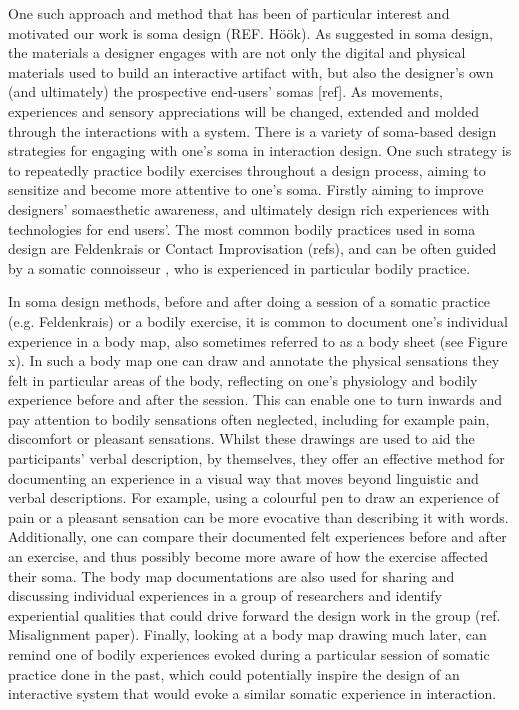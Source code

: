 One such approach and method that has been of particular interest and motivated our work is soma design (REF. Höök). As suggested in soma design, the materials a designer engages with are not only the digital and physical materials used to build an interactive artifact with, but also the designer’s own (and ultimately) the prospective end-users’ somas [ref]. As movements, experiences and sensory appreciations will be changed, extended and molded through the interactions with a system. There is a variety of soma-based design strategies for engaging with one's soma in interaction design. One such strategy is to repeatedly practice bodily exercises throughout a design process, aiming to sensitize and become more attentive to one's soma. Firstly aiming to improve designers’ somaesthetic awareness, and ultimately design rich experiences with technologies for end users'. The most common bodily practices used in soma design are Feldenkrais or Contact Improvisation (refs), and can be often guided by a somatic connoisseur \cite{schiphorst_self-evidence_2011}, who is experienced in particular bodily practice.

In soma design methods, before and after doing a session of a somatic practice (e.g. Feldenkrais) or a bodily exercise, it is common to document one's individual experience in a body map, also sometimes referred to as a body sheet \cite{windlin_soma_2019}(see Figure x). In such a body map one can draw and annotate the physical sensations they felt in particular areas of the body, reflecting on one's physiology and bodily experience before and after the session. This can enable one to turn inwards and pay attention to bodily sensations often neglected, including for example pain, discomfort or pleasant sensations.
Whilst these drawings are used to aid the participants' verbal description, by themselves, they offer an effective method for documenting an experience in a visual way that moves beyond linguistic and verbal descriptions.
For example, using a colourful pen to draw an experience of pain or a pleasant sensation can be more evocative than describing it with words. Additionally, one can compare their documented felt experiences before and after an exercise, and thus possibly become more aware of how the exercise affected their soma. The body map documentations are also used for sharing and discussing individual experiences in a group of researchers and identify experiential qualities that could drive forward the design work in the group (ref. Misalignment paper). Finally, looking at a body map drawing much later, can remind one of bodily experiences evoked during a particular session of somatic practice done in the past, which could potentially inspire the design of an interactive system that would evoke a similar somatic experience in interaction. 

